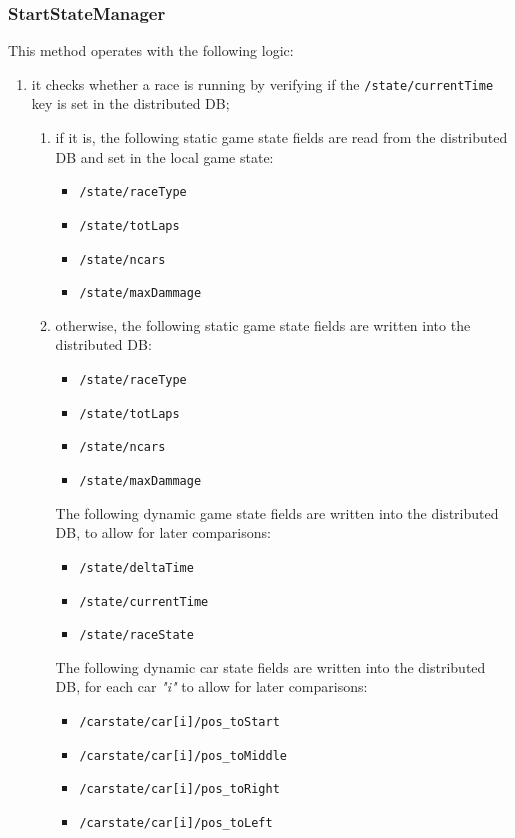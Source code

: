\subsubsection{StartStateManager}
This method operates with the following logic:
\begin{enumerate}
	\item it checks whether a race is running by verifying if the \texttt{/state/currentTime} key is set in the distributed DB;
	\begin{enumerate}
		\item if it is, the following static game state fields are read from the distributed DB and set in the local game state:
		\begin{itemize}
			\item \texttt{/state/raceType}
			\item \texttt{/state/totLaps}
			\item \texttt{/state/ncars}
			\item \texttt{/state/maxDammage}
		\end{itemize}
		\item otherwise, the following static game state fields are written into the distributed DB:
		\begin{itemize}
			\item \texttt{/state/raceType}
			\item \texttt{/state/totLaps}
			\item \texttt{/state/ncars}
			\item \texttt{/state/maxDammage}
		\end{itemize}
		The following dynamic game state fields are written into the distributed DB, to allow for later comparisons:
		\begin{itemize}
			\item \texttt{/state/deltaTime}
			\item \texttt{/state/currentTime}
			\item \texttt{/state/raceState}
		\end{itemize}
		The following dynamic car state fields are written into the distributed DB, for each car \textit{"i"} to allow for later comparisons:
		\begin{itemize}
			\item \texttt{/carstate/car[i]/pos\_toStart}
			\item \texttt{/carstate/car[i]/pos\_toMiddle}
			\item \texttt{/carstate/car[i]/pos\_toRight}
			\item \texttt{/carstate/car[i]/pos\_toLeft}

\end{itemize}
\end{enumerate}
\end{enumerate}
